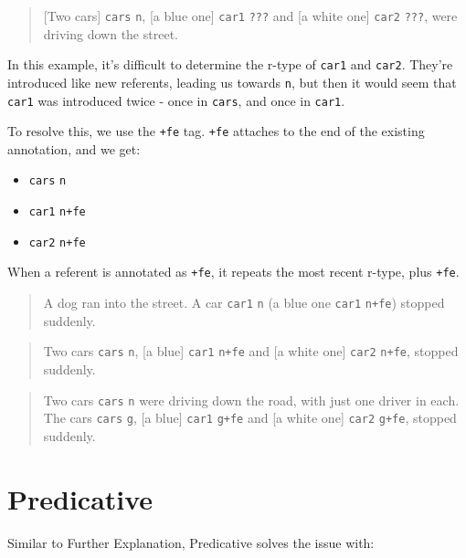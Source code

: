 \documentclass[
]{book}
\providecommand{\tightlist}{%
  \setlength{\itemsep}{0pt}\setlength{\parskip}{0pt}}
\begin{document}
\begin{quote}
{[}Two cars{]} \texttt{cars} \texttt{n}, {[}a blue one{]} \texttt{car1} \texttt{???} and {[}a white one{]} \texttt{car2} \texttt{???}, were driving down the street.
\end{quote}

In this example, it's difficult to determine the r-type of \texttt{car1} and \texttt{car2}.
They're introduced like new referents, leading us towards \texttt{n}, but then it would seem that \texttt{car1} was introduced twice -
once in \texttt{cars}, and once in \texttt{car1}.

To resolve this, we use the \texttt{+fe} tag.
\texttt{+fe} attaches to the end of the existing annotation, and we get:

\begin{itemize}
\tightlist
\item
  \texttt{cars} \texttt{n}
\item
  \texttt{car1} \texttt{n+fe}
\item
  \texttt{car2} \texttt{n+fe}
\end{itemize}

When a referent is annotated as \texttt{+fe}, it repeats the most recent r-type, plus \texttt{+fe}.

\begin{quote}
A dog ran into the street. A car \texttt{car1} \texttt{n} (a blue one \texttt{car1} \texttt{n+fe}) stopped suddenly.
\end{quote}

\begin{quote}
Two cars \texttt{cars} \texttt{n},
{[}a blue{]} \texttt{car1} \texttt{n+fe} and {[}a white one{]} \texttt{car2} \texttt{n+fe},
stopped suddenly.
\end{quote}

\begin{quote}
Two cars \texttt{cars} \texttt{n} were driving down the road,
with just one driver in each.
The cars \texttt{cars} \texttt{g},
{[}a blue{]} \texttt{car1} \texttt{g+fe} and {[}a white one{]} \texttt{car2} \texttt{g+fe},
stopped suddenly.
\end{quote}

\hypertarget{predicative}{%
\section{Predicative}\label{predicative}}

Similar to Further Explanation, Predicative solves the issue with:
\end{document}
